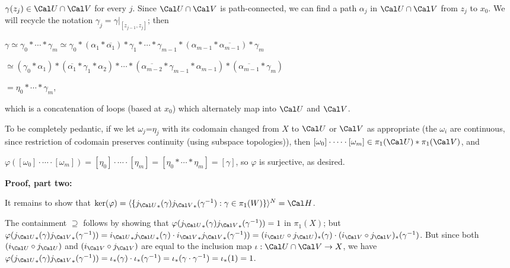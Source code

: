 $\gamma(z_j)\in{\Cal U}\cap{\Cal V}$ for every $j$. Since ${\Cal U}\cap{\Cal V}$ is path-connected,
we can find a path $\alpha_j$ in ${\Cal U}\cap{\Cal V}$ from $z_j$ to $x_0$. 
We will recycle the notation $\gamma_j=\gamma|_{[z_{j-1},z_j]}$; then

\msk

$\gamma\simeq\gamma_0*\cdots *\gamma_m\simeq
\gamma_0*(\alpha_1*\overline{\alpha_1})*\gamma_1*\cdots *\gamma_{m-1}*(\alpha_{m-1}*\overline{\alpha_{m-1}})*\gamma_m$

$\simeq 
(\gamma_0*\alpha_1)*(\overline{\alpha_1}*\gamma_1*\alpha_2)*\cdots *(\overline{\alpha_{m-2}}*
\gamma_{m-1}*\alpha_{m-1})*(\overline{\alpha_{m-1}}*\gamma_m)$

$=\eta_0*\cdots *\gamma_m$, 

\ssk

which is a concatenation of loops (based at $x_0$) which alternately map into
${\Cal U}$ and ${\Cal V}$. 

\msk

To be completely pedantic, if we let $\omega_j$=$\eta_j$ with its codomain changed from $X$ to ${\Cal U}$ or ${\Cal V}$
as appropriate (the $\omega_i$ are continuous, since restriction of codomain preserves continuity (using subspace 
topologies)), then $[\omega_0]\cdot \cdots \cdot [\omega_m]\in \pi_1({\Cal U})*\pi_1({\Cal V})$, and

\ssk

$\varphi([\omega_0]\cdot \cdots \cdot [\omega_m])=[\eta_0]\cdot \cdots \cdot [\eta_m]=[\eta_0*\cdots *\eta_m]=[\gamma]$,
so $\varphi$ is surjective, as desired.

\vfill
\eject

{\bf Proof, part two:}

\msk

It remains to show that $\ker(\varphi)=\langle \{{j_{\Cal U}}_*(\gamma){j_{\Cal V}}_*(\gamma^{-1}) : \gamma\in\pi_1(W)\}\rangle^N={\Cal H}$.

\msk

The containment $\supseteq$ follows by showing that $\varphi({j_{\Cal U}}_*(\gamma){j_{\Cal V}}_*(\gamma^{-1}))=1$
in $\pi_1(X)$; but $\varphi({j_{\Cal U}}_*(\gamma){j_{\Cal V}}_*(\gamma^{-1}))
={i_{\Cal U}}_*{j_{\Cal U}}_*(\gamma)\cdot {i_{\Cal V}}_*{j_{\Cal V}}_*(\gamma^{-1}))
=(i_{\Cal U}\circ j_{\Cal U})_*(\gamma)\cdot (i_{\Cal V}\circ j_{\Cal V})_*(\gamma^{-1})$.
But since both $(i_{\Cal U}\circ j_{\Cal U})$ and $(i_{\Cal V}\circ j_{\Cal V})$ are equal to the
inclusion map $\iota:{\Cal U}\cap{\Cal V}\ra X$, 
we have $\varphi({j_{\Cal U}}_*(\gamma){j_{\Cal V}}_*(\gamma^{-1}))=\iota_*(\gamma)\cdot \iota_*(\gamma^{-1})
=\iota_*(\gamma\cdot\gamma^{-1})=\iota_*(1)=1$.

